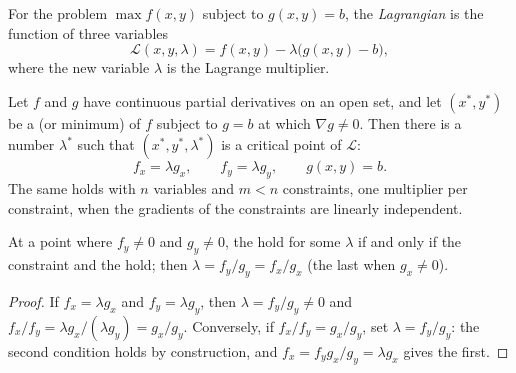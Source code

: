 \begin{definition}[Lagrangian]\label{def:b1:constrained-optimisation:lagrangian}
For the problem $\max f(x, y)$ subject to $g(x, y) = b$, the
\emph{Lagrangian} is the function of three variables
\[
\mathcal{L}(x, y, \lambda) = f(x, y) - \lambda\bigl(g(x, y) - b\bigr),
\]
where the new variable $\lambda$ is the Lagrange multiplier.
\end{definition}

\begin{theorem}\label{thm:b1:constrained-optimisation:lagrange}
Let $f$ and $g$ have continuous partial derivatives on an open set, and let
$(x^*, y^*)$ be a  (or minimum) of $f$ subject to $g = b$
at which $\nabla g \neq 0$. Then there is a number $\lambda^*$ such that
$(x^*, y^*, \lambda^*)$ is a critical point of $\mathcal L$:
\[
f_x = \lambda g_x, \qquad f_y = \lambda g_y, \qquad g(x, y) = b .
\]
The same holds with $n$ variables and $m < n$ constraints, one multiplier
per constraint, when the gradients of the constraints are linearly
independent.
\end{theorem}
\admitted

\begin{proposition}\label{prop:b1:constrained-optimisation:equivalence}
At a point where $f_y \neq 0$ and $g_y \neq 0$, the  hold
for some $\lambda$ if and only if the constraint and the 
hold; then $\lambda = f_y/g_y = f_x/g_x$ (the last when $g_x \neq 0$).
\end{proposition}

\begin{proof}
If $f_x = \lambda g_x$ and $f_y = \lambda g_y$, then $\lambda = f_y/g_y \neq 0$
and $f_x/f_y = \lambda g_x/(\lambda g_y) = g_x/g_y$. Conversely, if
$f_x/f_y = g_x/g_y$, set $\lambda = f_y/g_y$: the second condition holds by
construction, and $f_x = f_y g_x/g_y = \lambda g_x$ gives the first.
\end{proof}

